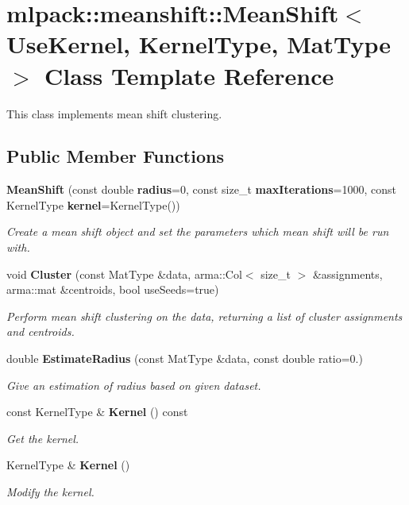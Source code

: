 \section{mlpack\+:\+:meanshift\+:\+:Mean\+Shift$<$ Use\+Kernel, Kernel\+Type, Mat\+Type $>$ Class Template Reference}
\label{classmlpack_1_1meanshift_1_1MeanShift}


This class implements mean shift clustering.  


\subsection*{Public Member Functions}
\begin{DoxyCompactItemize}
\item 
{\bf Mean\+Shift} (const double {\bf radius}=0, const size\+\_\+t {\bf max\+Iterations}=1000, const Kernel\+Type {\bf kernel}=Kernel\+Type())
\begin{DoxyCompactList}\small\item\em Create a mean shift object and set the parameters which mean shift will be run with. \end{DoxyCompactList}\item 
void {\bf Cluster} (const Mat\+Type \&data, arma\+::\+Col$<$ size\+\_\+t $>$ \&assignments, arma\+::mat \&centroids, bool use\+Seeds=true)
\begin{DoxyCompactList}\small\item\em Perform mean shift clustering on the data, returning a list of cluster assignments and centroids. \end{DoxyCompactList}\item 
double {\bf Estimate\+Radius} (const Mat\+Type \&data, const double ratio=0.)
\begin{DoxyCompactList}\small\item\em Give an estimation of radius based on given dataset. \end{DoxyCompactList}\item 
const Kernel\+Type \& {\bf Kernel} () const 
\begin{DoxyCompactList}\small\item\em Get the kernel. \end{DoxyCompactList}\item 
Kernel\+Type \& {\bf Kernel} ()
\begin{DoxyCompactList}\small\item\em Modify the kernel. \end{DoxyCompactList}\item 

\end{DoxyCompactItemize}
